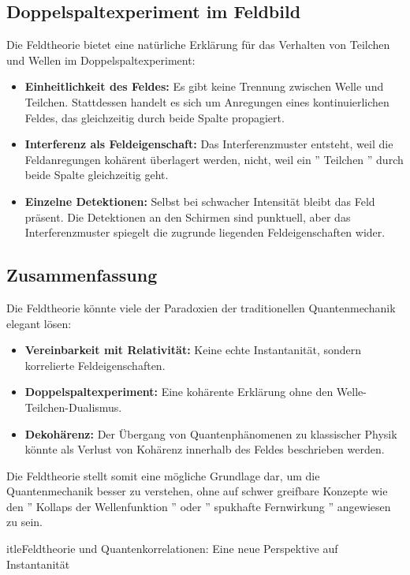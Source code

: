 \documentclass[12pt,a4paper]{article}
\begin{document}
	\subsection{Doppelspaltexperiment im Feldbild}
	Die Feldtheorie bietet eine natürliche Erklärung für das Verhalten von Teilchen und Wellen im Doppelspaltexperiment:
	\begin{itemize}
		\item \textbf{Einheitlichkeit des Feldes:} Es gibt keine Trennung zwischen Welle und Teilchen. Stattdessen handelt es sich um Anregungen eines kontinuierlichen Feldes, das gleichzeitig durch beide Spalte propagiert.
		\item \textbf{Interferenz als Feldeigenschaft:} Das Interferenzmuster entsteht, weil die Feldanregungen kohärent überlagert werden, nicht, weil ein '' Teilchen '' durch beide Spalte gleichzeitig geht.
		\item \textbf{Einzelne Detektionen:} Selbst bei schwacher Intensität bleibt das Feld präsent. Die Detektionen an den Schirmen sind punktuell, aber das Interferenzmuster spiegelt die zugrunde liegenden Feldeigenschaften wider.
	\end{itemize}
	
	\subsection{Zusammenfassung}
	Die Feldtheorie könnte viele der Paradoxien der traditionellen Quantenmechanik elegant lösen:
	\begin{itemize}
		\item \textbf{Vereinbarkeit mit Relativität:} Keine echte Instantanität, sondern korrelierte Feldeigenschaften.
		\item \textbf{Doppelspaltexperiment:} Eine kohärente Erklärung ohne den Welle-Teilchen-Dualismus.
		\item \textbf{Dekohärenz:} Der Übergang von Quantenphänomenen zu klassischer Physik könnte als Verlust von Kohärenz innerhalb des Feldes beschrieben werden.
	\end{itemize}
	
	Die Feldtheorie stellt somit eine mögliche Grundlage dar, um die Quantenmechanik besser zu verstehen, ohne auf schwer greifbare Konzepte wie den '' Kollaps der Wellenfunktion '' oder '' spukhafte Fernwirkung '' angewiesen zu sein.
	
	
		itle{Feldtheorie und Quantenkorrelationen: Eine neue Perspektive auf Instantanität}
	
	
	\maketitle
	
\end{document}
